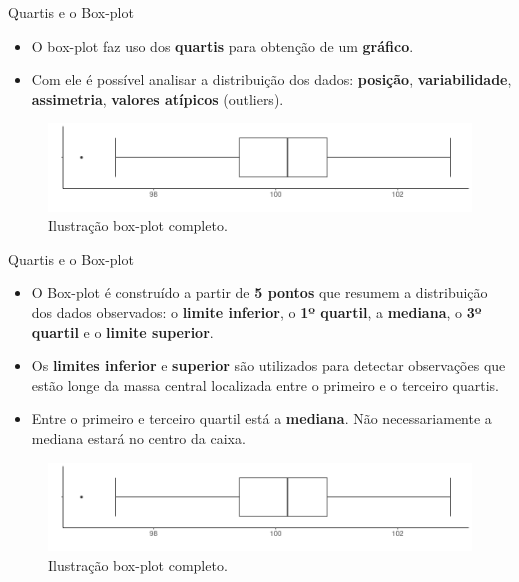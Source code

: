 \documentclass[
  ignorenonframetext,
  serif,
  professionalfont,
  usenames,
  dvipsnames,
  aspectratio = 169]{beamer}
\providecommand{\tightlist}{%
  \setlength{\itemsep}{0pt}\setlength{\parskip}{0pt}}
\renewcommand{\tightlist}{%
  \setlength{\itemsep}{0\baselineskip}
  \setlength{\parskip}{0.25\baselineskip}
}
\begin{document}
\begin{frame}{Quartis e o Box-plot}
\label{quartis-e-o-box-plot}
\begin{itemize}
\tightlist
\item
  O box-plot faz uso dos \textbf{quartis} para obtenção de um
  \textbf{gráfico}.
\item
  Com ele é possível analisar a distribuição dos dados:
  \textbf{posição}, \textbf{variabilidade}, \textbf{assimetria},
  \textbf{valores atípicos} (outliers).
\end{itemize}

\begin{figure}

{\centering \includegraphics[width=0.9\linewidth]{./img/boxplot0} 

}

\caption{Ilustração box-plot completo.}\label{fig:unnamed-chunk-11}
\end{figure}
\end{frame}

\begin{frame}{Quartis e o Box-plot}
\label{quartis-e-o-box-plot-1}
\begin{itemize}
\item
  O Box-plot é construído a partir de \textbf{5 pontos} que resumem a
  distribuição dos dados observados: o \textbf{limite inferior}, o
  \textbf{1º quartil}, a \textbf{mediana}, o \textbf{3º quartil} e o
  \textbf{limite superior}.
\item
  Os \textbf{limites inferior} e \textbf{superior} são utilizados para
  detectar observações que estão longe da massa central localizada entre
  o primeiro e o terceiro quartis.
\item
  Entre o primeiro e terceiro quartil está a \textbf{mediana}. Não
  necessariamente a mediana estará no centro da caixa.
\end{itemize}

\begin{figure}

{\centering \includegraphics[width=0.9\linewidth]{./img/boxplot0} 

}

\caption{Ilustração box-plot completo.}\label{fig:unnamed-chunk-12}
\end{figure}
\end{frame}
\end{document}
